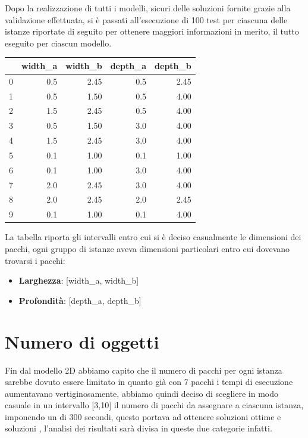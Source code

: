 Dopo la realizzazione di tutti i modelli, sicuri delle soluzioni fornite grazie alla validazione effettuata, si è passati all'esecuzione di 100 test per ciascuna delle istanze riportate di seguito per ottenere maggiori informazioni in merito, il tutto eseguito per ciascun modello.
\begin{center}
	\begin{tabular}{lrrrr}
		\toprule
		{} & width\_a & width\_b & depth\_a & depth\_b \\
		\midrule
		0  & 0.5      & 2.45     & 0.5      & 2.45     \\
		1  & 0.5      & 1.50     & 0.5      & 4.00     \\
		2  & 1.5      & 2.45     & 0.5      & 4.00     \\
		3  & 0.5      & 1.50     & 3.0      & 4.00     \\
		4  & 1.5      & 2.45     & 3.0      & 4.00     \\
		5  & 0.1      & 1.00     & 0.1      & 1.00     \\
		6  & 0.1      & 1.00     & 3.0      & 4.00     \\
		7  & 2.0      & 2.45     & 3.0      & 4.00     \\
		8  & 2.0      & 2.45     & 2.0      & 2.45     \\
		9  & 0.1      & 1.00     & 0.1      & 4.00     \\
		\bottomrule
	\end{tabular}
\end{center}

La tabella riporta gli intervalli entro cui si è deciso casualmente le dimensioni dei pacchi, ogni gruppo di istanze aveva dimensioni particolari entro cui dovevano trovarsi i pacchi:
\begin{itemize}
	\item \textbf{Larghezza}: [width\_a, width\_b]
	\item \textbf{Profondità}: [depth\_a, depth\_b]
\end{itemize}

\section{Numero di oggetti}
Fin dal modello 2D abbiamo capito che il numero di pacchi per ogni istanza sarebbe dovuto essere limitato in quanto già con 7 pacchi i tempi di esecuzione aumentavano vertiginosamente, abbiamo quindi deciso di scegliere in modo casuale in un intervallo [3,10] il numero di pacchi da assegnare a ciascuna istanza, imponendo un  di 300 secondi, questo portava ad ottenere soluzioni ottime e soluzioni , l'analisi dei risultati sarà divisa in queste due categorie infatti.

